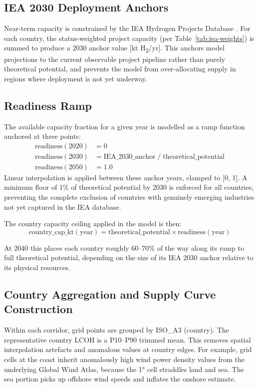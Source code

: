 \subsection{IEA 2030 Deployment Anchors}

Near-term capacity is constrained by the IEA Hydrogen Projects Database \citep{IEA2026}. For each country, the status-weighted project capacity (per Table~\ref{tab:iea-weights}) is summed to produce a 2030 anchor value [kt H\textsubscript{2}/yr]. This anchors model projections to the current observable project pipeline rather than purely theoretical potential, and prevents the model from over-allocating supply in regions where deployment is not yet underway.

\subsection{Readiness Ramp}

The available capacity fraction for a given year is modelled as a ramp function anchored at three points:
\begin{align}
    \text{readiness}(2020) &= 0 \\
    \text{readiness}(2030) &= \text{IEA\_2030\_anchor} \;/\; \text{theoretical\_potential} \\
    \text{readiness}(2050) &= 1.0
\end{align}
Linear interpolation is applied between these anchor years, clamped to [0, 1]. A minimum floor of 1\% of theoretical potential by 2030 is enforced for all countries, preventing the complete exclusion of countries with genuinely emerging industries not yet captured in the IEA database.

The country capacity ceiling applied in the model is then:
\begin{equation}
    \text{country\_cap\_kt}(\text{year}) = \text{theoretical\_potential} \times \text{readiness}(\text{year})
\end{equation}

At 2040 this places each country roughly 60--70\% of the way along its ramp to full theoretical potential, depending on the size of its IEA 2030 anchor relative to its physical resources.

\subsection{Country Aggregation and Supply Curve Construction}

Within each corridor, grid points are grouped by ISO\_A3 (country). The representative country LCOH is a P10--P90 trimmed mean. This removes spatial interpolation artefacts and anomalous values at country edges. For example, grid cells at the coast inherit anomalously high wind power density values from the underlying Global Wind Atlas, because the 1° cell straddles land and sea. The sea portion picks up offshore wind speeds and inflates the onshore estimate.

